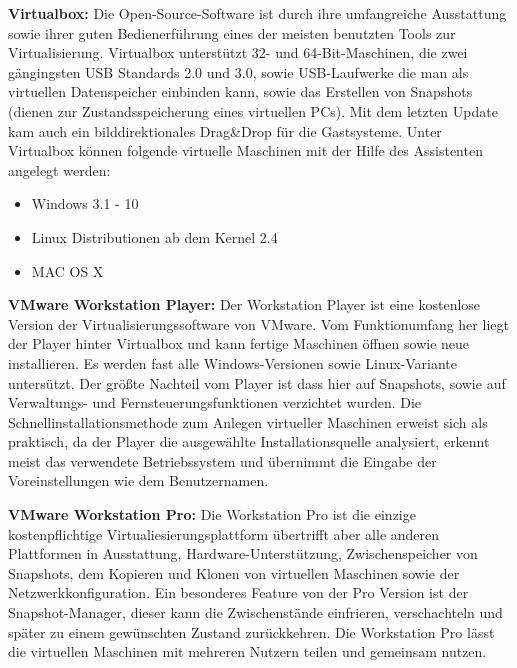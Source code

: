 \textbf{Virtualbox:} Die Open-Source-Software ist durch ihre umfangreiche Ausstattung sowie ihrer 
guten Bedienerführung eines der meisten benutzten Tools zur Virtualisierung. Virtualbox unterstützt 32- 
und 64-Bit-Maschinen, die zwei gängingsten USB Standards 2.0 und 3.0, sowie USB-Laufwerke die man als 
virtuellen Datenspeicher einbinden kann, sowie das Erstellen von Snapshots (dienen zur Zustandsspeicherung eines virtuellen PCs).
Mit dem letzten Update kam auch ein bilddirektionales Drag\&Drop für die Gastsysteme. Unter Virtualbox können folgende virtuelle Maschinen 
mit der Hilfe des Assistenten angelegt werden:
\begin{itemize}
        \item Windows 3.1 - 10
        \item Linux Distributionen ab dem Kernel 2.4
        \item MAC OS X
\end{itemize} 

\noindent
\newline
\textbf{VMware Workstation Player:} Der Workstation Player ist eine kostenlose Version der Virtualisierungssoftware
von VMware. Vom Funktionumfang her liegt der Player hinter Virtualbox und kann fertige Maschinen öffnen sowie neue installieren.
Es werden fast alle Windows-Versionen sowie Linux-Variante untersützt. Der größte Nachteil vom Player ist dass hier auf 
Snapshots, sowie auf Verwaltungs- und Fernsteuerungsfunktionen verzichtet wurden. Die Schnellinstallationsmethode zum Anlegen 
virtueller Maschinen erweist sich als praktisch, da der Player die ausgewählte Installationsquelle analysiert, erkennt meist das 
verwendete Betriebssystem und übernimmt die Eingabe der Voreinstellungen wie dem Benutzernamen.

\noindent
\newline
\textbf{VMware Workstation Pro: } Die Workstation Pro ist die einzige kostenpflichtige Virtualiesierungsplattform übertrifft aber 
alle anderen Plattformen in Ausstattung, Hardware-Unterstützung, Zwischenspeicher von Snapshots, dem Kopieren und Klonen von 
virtuellen Maschinen sowie der Netzwerkkonfiguration. Ein besonderes Feature von der Pro Version ist der Snapshot-Manager, dieser
kann die Zwischenstände einfrieren, verschachteln und später zu einem gewünschten Zustand zurückkehren. Die Workstation Pro lässt 
die virtuellen Maschinen mit mehreren Nutzern teilen und gemeinsam nutzen. 

